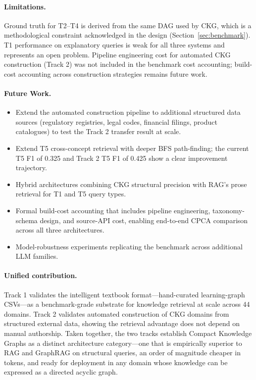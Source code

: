 \paragraph{Limitations.}
Ground truth for T2--T4 is derived from the same DAG used by CKG, which
is a methodological constraint acknowledged in the design
(Section~\ref{sec:benchmark}). T1 performance on explanatory queries is
weak for all three systems and represents an open problem. Pipeline
engineering cost for automated CKG construction (Track 2) was not
included in the benchmark cost accounting; build-cost accounting across
construction strategies remains future work.

\paragraph{Future Work.}
\begin{itemize}
  \item Extend the automated construction pipeline to additional
    structured data sources (regulatory registries, legal codes,
    financial filings, product catalogues) to test the Track 2 transfer
    result at scale.
  \item Extend T5 cross-concept retrieval with deeper BFS path-finding;
    the current T5 F1 of 0.325 and Track 2 T5 F1 of 0.425 show a clear
    improvement trajectory.
  \item Hybrid architectures combining CKG structural precision with
    RAG's prose retrieval for T1 and T5 query types.
  \item Formal build-cost accounting that includes pipeline engineering,
    taxonomy-schema design, and source-API cost, enabling end-to-end
    CPCA comparison across all three architectures.
  \item Model-robustness experiments replicating the benchmark across
    additional LLM families.
\end{itemize}

\paragraph{Unified contribution.}
Track 1 validates the intelligent textbook format---hand-curated
learning-graph CSVs---as a benchmark-grade substrate for knowledge
retrieval at scale across 44 domains. Track 2 validates automated
construction of CKG domains from structured external data, showing the
retrieval advantage does not depend on manual authorship. Taken
together, the two tracks establish Compact Knowledge Graphs as a
distinct architecture category---one that is empirically superior to
RAG and GraphRAG on structural queries, an order of magnitude cheaper
in tokens, and ready for deployment in any domain whose knowledge can
be expressed as a directed acyclic graph.


